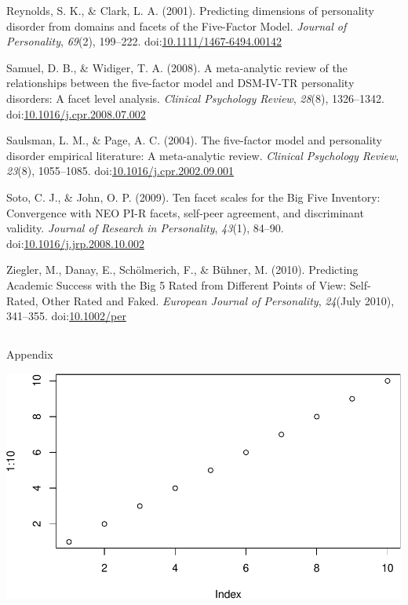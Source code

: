 \documentclass[,man,floatsintext]{apa6}
\theoremstyle{definition}
\theoremstyle{definition}
\theoremstyle{definition}
\theoremstyle{remark}
\begin{document}
\leavevmode\hypertarget{ref-ClarkReynolds2001}{}%
Reynolds, S. K., \& Clark, L. A. (2001). Predicting dimensions of
personality disorder from domains and facets of the Five-Factor Model.
\emph{Journal of Personality}, \emph{69}(2), 199--222.
doi:\href{https://doi.org/10.1111/1467-6494.00142}{10.1111/1467-6494.00142}

\leavevmode\hypertarget{ref-SamuelWidiger2008}{}%
Samuel, D. B., \& Widiger, T. A. (2008). A meta-analytic review of the
relationships between the five-factor model and DSM-IV-TR personality
disorders: A facet level analysis. \emph{Clinical Psychology Review},
\emph{28}(8), 1326--1342.
doi:\href{https://doi.org/10.1016/j.cpr.2008.07.002}{10.1016/j.cpr.2008.07.002}

\leavevmode\hypertarget{ref-SaulsmanPage2004}{}%
Saulsman, L. M., \& Page, A. C. (2004). The five-factor model and
personality disorder empirical literature: A meta-analytic review.
\emph{Clinical Psychology Review}, \emph{23}(8), 1055--1085.
doi:\href{https://doi.org/10.1016/j.cpr.2002.09.001}{10.1016/j.cpr.2002.09.001}

\leavevmode\hypertarget{ref-SotoJohn2009}{}%
Soto, C. J., \& John, O. P. (2009). Ten facet scales for the Big Five
Inventory: Convergence with NEO PI-R facets, self-peer agreement, and
discriminant validity. \emph{Journal of Research in Personality},
\emph{43}(1), 84--90.
doi:\href{https://doi.org/10.1016/j.jrp.2008.10.002}{10.1016/j.jrp.2008.10.002}

\leavevmode\hypertarget{ref-Ziegler2010}{}%
Ziegler, M., Danay, E., Schölmerich, F., \& Bühner, M. (2010).
Predicting Academic Success with the Big 5 Rated from Different Points
of View: Self-Rated, Other Rated and Faked. \emph{European Journal of
Personality}, \emph{24}(July 2010), 341--355.
doi:\href{https://doi.org/10.1002/per}{10.1002/per}

\endgroup

\clearpage
\makeatletter
\efloat@restorefloats
\makeatother


\begin{appendix}
\section{}
Appendix

\includegraphics{IPIP_draft_files/figure-latex/unnamed-chunk-4-1.pdf}
\end{appendix}
\end{document}
